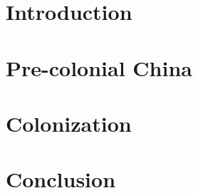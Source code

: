 \section{Introduction}



\section{Pre-colonial China}



\section{Colonization}



\section{Conclusion}


